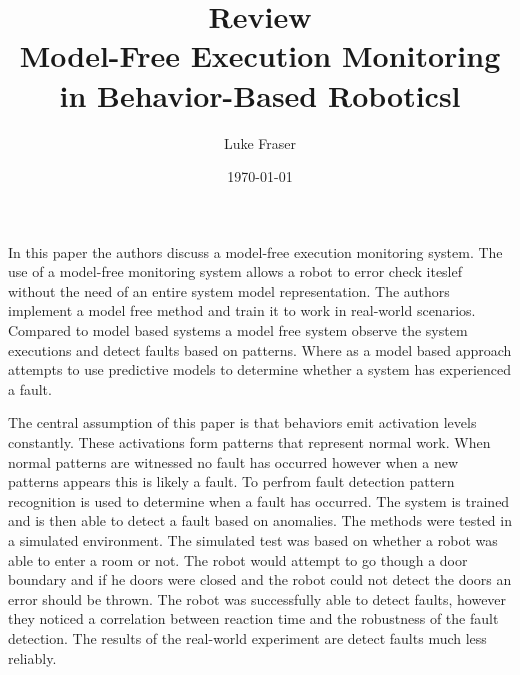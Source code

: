 \documentclass{article}
\begin{document}
\title{{\large Review} \\ Model-Free Execution Monitoring in Behavior-Based Roboticsl}
\author{Luke Fraser}
\date{\today}
\maketitle

\begingroup
\renewcommand{\section}[2]{}


\endgroup

\section*{Summary}
In this paper the authors discuss a model-free execution monitoring system. The use of a model-free monitoring system allows a robot to error check iteslef without the need of an entire system model representation. The authors implement a model free method and train it to work in real-world scenarios. Compared to model based systems a model free system observe the system executions and detect faults based on patterns. Where as a model based approach attempts to use predictive models to determine whether a system has experienced a fault.

The central assumption of this paper is that behaviors emit activation levels constantly. These activations form patterns that represent normal work. When normal patterns are witnessed no fault has occurred however when a new patterns appears this is likely a fault. To perfrom fault detection pattern recognition is used to determine when a fault has occurred. The system is trained and is then able to detect a fault based on anomalies. The methods were tested in a simulated environment. The simulated test was based on whether a robot was able to enter a room or not. The robot would attempt to go though a door boundary and if he doors were closed and the robot could not detect the doors an error should be thrown. The robot was successfully able to detect faults, however they noticed a correlation between reaction time and the robustness of the fault detection. The results of the real-world experiment are detect faults much less reliably.
\end{document}
